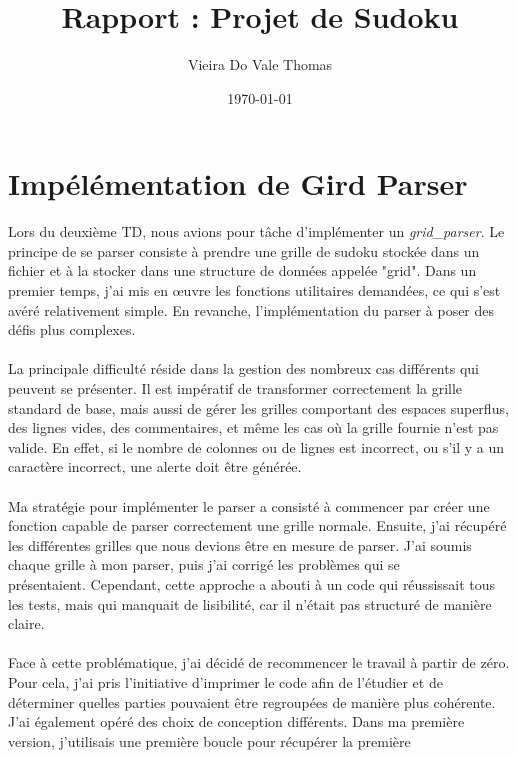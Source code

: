 \documentclass{article}
\title{Rapport : Projet de Sudoku}
\author{Vieira Do Vale Thomas}
\date{\today}
\begin{document}
\maketitle

\newpage

\renewcommand*\contentsname{Sommaire}
\tableofcontents

\newpage
\section{Impélémentation de Gird Parser} 
Lors du deuxième TD, nous avions pour tâche d'implémenter un  
\textit{grid\_parser}. Le principe de se parser consiste à prendre une grille 
de sudoku stockée dans un fichier et à la stocker dans une structure de données 
appelée "grid". Dans un premier temps, j'ai mis en œuvre les fonctions
 utilitaires demandées, ce qui s'est avéré relativement simple. En revanche, 
 l'implémentation du parser à poser des défis plus complexes.
\\ \\
La principale difficulté réside dans la gestion des nombreux cas différents 
qui peuvent se présenter. Il est impératif de transformer correctement la grille
standard de base, mais aussi de gérer les grilles comportant des espaces 
superflus, des lignes vides, des commentaires, et même les cas où la grille 
fournie n'est pas valide. En effet, si le nombre de colonnes ou de lignes est 
incorrect, ou s'il y a un caractère incorrect, une alerte doit être générée. 
\\ \\
Ma stratégie pour implémenter le parser a consisté à commencer par créer une 
fonction capable de parser correctement une grille normale. Ensuite, j'ai 
récupéré les différentes grilles que nous devions être en mesure de parser. J'ai
soumis chaque grille à mon parser, puis j'ai corrigé les problèmes qui se \\ 
présentaient. Cependant, cette approche a abouti à un code qui réussissait tous
les tests, mais qui manquait de lisibilité, car il n'était pas structuré de 
manière claire. 
\\ \\
Face à cette problématique, j'ai décidé de recommencer le travail à partir de 
zéro. Pour cela, j'ai pris l'initiative d'imprimer le code afin de l'étudier et
de déterminer quelles parties pouvaient être regroupées de manière plus 
cohérente. J'ai également opéré des choix de conception différents. Dans ma 
première version, j'utilisais une première boucle pour récupérer la première 
\end{document}
